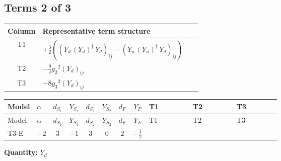 \documentclass[8pt]{article}
\begin{document}
\begin{landscape}
\subsection*{Terms 2 of 3}
\begin{center}
\begin{tabular}{@{}c >{\raggedright\arraybackslash}p{0.82\linewidth}@{}}
\toprule
Column & Representative term structure \\
\midrule
T1 & \(\displaystyle +\frac{3}{2} (\left({Y_d}\,\left({Y_d}\right)^{\dagger}\,{Y_d}\right)_{ij}-\left({Y_u}\,\left({Y_u}\right)^{\dagger}\,{Y_d}\right)_{ij})\) \\
\midrule
T2 & \(\displaystyle -\frac{9}{4} {g_2}^2 \left({Y_d}\right)_{ij}\) \\
\midrule
T3 & \(\displaystyle -8 {g_3}^2 \left({Y_d}\right)_{ij}\) \\
\midrule
\bottomrule
\end{tabular}
\end{center}
\smallskip
\tiny
\begin{longtable}{@{}llcccccc >{\raggedright\arraybackslash}p{0.21\linewidth} >{\raggedright\arraybackslash}p{0.21\linewidth} >{\raggedright\arraybackslash}p{0.21\linewidth}@{}}
\toprule
Model & $\alpha$ & $d_{S_1}$ & $Y_{S_1}$ & $d_{S_2}$ & $Y_{S_2}$ & $d_F$ & $Y_F$ & T1 & T2 & T3 \\
\midrule
\endfirsthead
\toprule
Model & $\alpha$ & $d_{S_1}$ & $Y_{S_1}$ & $d_{S_2}$ & $Y_{S_2}$ & $d_F$ & $Y_F$ & T1 & T2 & T3 \\
\midrule
\endhead
T3-E & $-2$ & $3$ & $-1$ & $3$ & $0$ & $2$ & $-\frac{1}{2}$ & \scriptsize\adjustbox{max width=\linewidth}{$\begin{gathered} +\frac{3}{2} (\left({Y_d}\,\left({Y_d}\right)^{\dagger}\,{Y_d}\right)_{ij}-\left({Y_u}\,\left({Y_u}\right)^{\dagger}\,{Y_d}\right)_{ij})\end{gathered}$} & \scriptsize\adjustbox{max width=\linewidth}{$\begin{gathered} -\frac{9}{4} {g_2}^2 \left({Y_d}\right)_{ij}\end{gathered}$} & \scriptsize\adjustbox{max width=\linewidth}{$\begin{gathered} -8 {g_3}^2 \left({Y_d}\right)_{ij}\end{gathered}$} \\
\midrule
\bottomrule
\end{longtable}
\clearpage
\noindent\textbf{Quantity: }$Y_d$\par\smallskip

\end{landscape}
\end{document}
